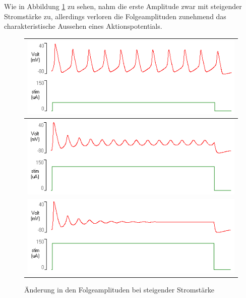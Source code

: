 \documentclass[a4paper]{article}
\begin{document}
\vspace{2.5\baselineskip}

\noindent Wie in Abbildung \ref{fig:A2_4} zu sehen, nahm die erste Amplitude zwar mit steigender Stromstärke zu, allerdings verloren die Folgeamplituden zunehmend das charakteristische Aussehen eines Aktionspotentials.\\

\begin{figure}[H]
    \centering
    \begin{tabular}{|c|}
        \hline
         \includegraphics{images/Aufgabe2_4_amp42_Amps.png} \\
         \hline
         \includegraphics{images/Aufgabe2_4_amp117_Amps.png}\\
         \hline
         \includegraphics{images/Aufgabe2_4_amp130_Amps.png}\\
         \hline
    \end{tabular}
    \caption{Änderung in den Folgeamplituden bei steigender Stromstärke}
    \label{fig:A2_4}
\end{figure}
\end{document}
